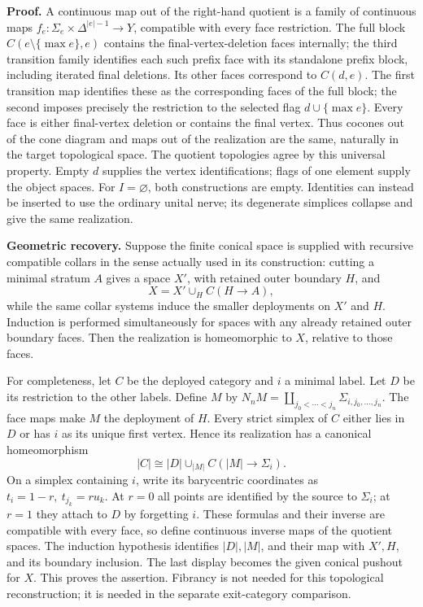 \textbf{Proof.} A continuous map out of the right-hand quotient is a family of continuous maps \(f_e:\Sigma_e\times\Delta^{|e|-1}\to Y\), compatible with every face restriction. The full block \(C(e\setminus\{\max e\},e)\) contains the final-vertex-deletion faces internally; the third transition family identifies each such prefix face with its standalone prefix block, including iterated final deletions. Its other faces correspond to \(C(d,e)\). The first transition map identifies these as the corresponding faces of the full block; the second imposes precisely the restriction to the selected flag \(d\cup\{\max e\}\). Every face is either final-vertex deletion or contains the final vertex. Thus cocones out of the cone diagram and maps out of the realization are the same, naturally in the target topological space. The quotient topologies agree by this universal property. Empty \(d\) supplies the vertex identifications; flags of one element supply the object spaces. For \(I=\varnothing\), both constructions are empty. Identities can instead be inserted to use the ordinary unital nerve; its degenerate simplices collapse and give the same realization.

\textbf{Geometric recovery.} Suppose the finite conical space is supplied with recursive compatible collars in the sense actually used in its construction: cutting a minimal stratum \(A\) gives a space \(X'\), with retained outer boundary \(H\), and \[
 X=X'\cup_H C(H\to A),
\] while the same collar systems induce the smaller deployments on \(X'\) and \(H\). Induction is performed simultaneously for spaces with any already retained outer boundary faces. Then the realization is homeomorphic to \(X\), relative to those faces.

For completeness, let \(C\) be the deployed category and \(i\) a minimal label. Let \(D\) be its restriction to the other labels. Define \(M\) by \(N_nM=\coprod_{j_0<\cdots<j_n}\Sigma_{i,j_0,\ldots,j_n}\). The face maps make \(M\) the deployment of \(H\). Every strict simplex of \(C\) either lies in \(D\) or has \(i\) as its unique first vertex. Hence its realization has a canonical homeomorphism \[
 |C|\cong |D|\cup_{|M|} C(|M|\to\Sigma_i).
\] On a simplex containing \(i\), write its barycentric coordinates as \(t_i=1-r,\ t_{j_k}=r u_k\). At \(r=0\) all points are identified by the source to \(\Sigma_i\); at \(r=1\) they attach to \(D\) by forgetting \(i\). These formulas and their inverse are compatible with every face, so define continuous inverse maps of the quotient spaces. The induction hypothesis identifies \(|D|,|M|\), and their map with \(X',H\), and its boundary inclusion. The last display becomes the given conical pushout for \(X\). This proves the assertion. Fibrancy is not needed for this topological reconstruction; it is needed in the separate exit-category comparison.

